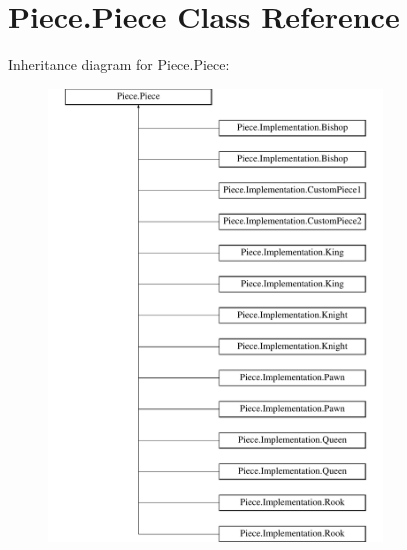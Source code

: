 \hypertarget{classPiece_1_1Piece}{\section{Piece.\-Piece Class Reference}
\label{classPiece_1_1Piece}
}
Inheritance diagram for Piece.\-Piece\-:\begin{figure}[H]
\begin{center}
\leavevmode
\includegraphics[height=12.000000cm]{classPiece_1_1Piece}
\end{center}
\end{figure}
